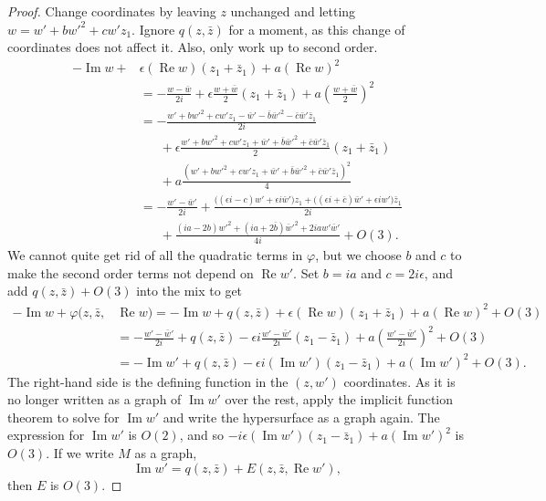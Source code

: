 \documentclass[12pt,openany]{book}
\renewcommand{\Re}{\operatorname{Re}}
\renewcommand{\Im}{\operatorname{Im}}
\theoremstyle{plain}
\theoremstyle{remark}
\theoremstyle{definition}
\theoremstyle{exercise}
\theoremstyle{example}
\begin{document}
\begin{proof}
Change coordinates
by leaving $z$ unchanged and letting $w = w'+bw'^2+cw'z_1$.  Ignore
$q(z,\bar{z})$ for a moment, as
this change of coordinates does not affect it.  Also, only work up to
second order.
\begin{equation*}
\begin{split}
-\Im w +
& \epsilon (\Re w) (z_1+\bar{z}_1)
+
a {(\Re w)}^2
\\
& =
-\frac{w-\bar{w}}{2i} +
\epsilon \frac{w+\bar{w}}{2}(z_1+\bar{z}_1)
+
a{\left(\frac{w+\bar{w}}{2}\right)}^2
\\
& =
-\frac{w'+bw'^2+cw'z_1-\bar{w}'-\bar{b}\bar{w}'^2-\bar{c}\bar{w}'\bar{z}_1}{2i}
\\
& \phantom{=}~
+\epsilon \frac{w'+bw'^2+cw'z_1+\bar{w}'+\bar{b}\bar{w}'^2+\bar{c}\bar{w}'\bar{z}_1}{2}(z_1+\bar{z}_1)
\\
& \phantom{=}~
+ a \frac{{(w'+bw'^2+cw'z_1+\bar{w}'+\bar{b}\bar{w}'^2+\bar{c}\bar{w}'\bar{z}_1)}^2}{4}
\\
& =
-\frac{w'-\bar{w}'}{2i}
+\frac{
\bigl((\epsilon i-c)w'
+\epsilon i\bar{w}'\bigr)z_1
+\bigl((\epsilon i+\bar{c})\bar{w}'
+\epsilon iw'\bigr)\bar{z}_1
}{2i}
\\
& \phantom{=}~
+ \frac{(ia-2b)w'^2+(ia+2\bar{b})\bar{w}'^2+2iaw'\bar{w}'}{4i}
+O(3) .
\end{split}
\end{equation*}
We cannot quite get rid of all the quadratic terms in $\varphi$, but we
choose $b$ and $c$ to make the second order terms not depend on $\Re w'$.
Set $b=ia$ and $c=2i\epsilon$, and add $q(z,\bar{z}) + O(3)$ into the mix
to get
\begin{equation*}
\begin{split}
-\Im w + \varphi(z,\bar{z}, & \Re w)  =
-\Im w +
q(z,\bar{z}) +
\epsilon (\Re w) (z_1+\bar{z}_1)
+ a{(\Re w)}^2
+O(3)
\\
& =
-\frac{w'-\bar{w}'}{2i}
+
q(z,\bar{z})
- \epsilon i
\frac{w' -\bar{w}'}{2i}
( z_1 -\bar{z}_1)
+ a {\left(\frac{w'-\bar{w}'}{2i}\right)}^2
+O(3)
\\
& =
-\Im w'
+ q(z,\bar{z})
-
\epsilon i
(\Im w')
( z_1 -\bar{z}_1)
+
a {(\Im w')}^2
+O(3) .
\end{split}
\end{equation*}
The right-hand side is the defining function in the $(z,w')$ coordinates.
As it is no longer written as a graph of $\Im w'$ over the
rest, apply the implicit
function theorem to solve for $\Im w'$
and write the hypersurface as a graph again.
The expression for $\Im w'$
is $O(2)$, and so $-i\epsilon (\Im w')(z_1-\bar{z}_1)+a{(\Im w')}^2$
is $O(3)$.
If we write $M$ as a graph,
\begin{equation*}
\Im w' = q(z,\bar{z}) + E(z,\bar{z},\Re w'),
\end{equation*}
then $E$ is $O(3)$.


\end{proof}
\end{document}
